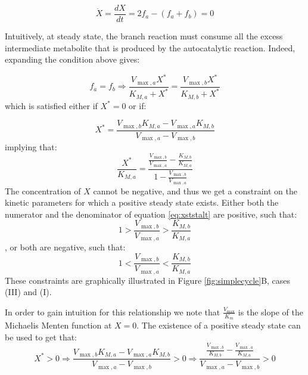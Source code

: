     \begin{equation}
      \label{eq:xdyna}
      \dot X = \frac{dX}{dt} = 2f_a - (f_a + f_b) = 0
    \end{equation}

    Intuitively, at steady state, the branch reaction must consume all the excess intermediate metabolite that is produced by the autocatalytic reaction.
    Indeed, expanding the condition above gives:

    \begin{equation*}
      f_a = f_b \Rightarrow \frac{V_{\max,a}X^*}{K_{M,a}+X^*}=\frac{V_{\max,b}X^*}{K_{M,b}+X^*}
    \end{equation*}
    which is satisfied either if $X^*=0$ or if:

    \begin{equation}
      \label{eq:xstst}
      X^*=\frac{V_{\max,b}K_{M,a}-V_{\max,a}K_{M,b}}{V_{\max,a}-V_{\max,b}}
    \end{equation}
    implying that:
    \begin{equation}
      \label{eq:xststalt}
      \frac{X^*}{K_{M,a}}=\frac{\frac{V_{\max,b}}{V_{\max,a}}-\frac{K_{M,b}}{K_{M,a}}}{1-\frac{V_{\max,b}}{V_{\max,a}}}
    \end{equation}
    The concentration of $X$ cannot be negative, and thus we get a constraint on the kinetic parameters for which a positive steady state exists.
    Either both the numerator and the denominator of equation \ref{eq:xststalt} are positive, such that:
    \begin{equation*}
    1>\frac{V_{\max,b}}{V_{\max,a}}>\frac{K_{M,b}}{K_{M,a}}
    \end{equation*}
    , or both are negative, such that:
    \begin{equation*}
    1<\frac{V_{\max,b}}{V_{\max,a}}<\frac{K_{M,b}}{K_{M,a}}
    \end{equation*}
    These constraints are graphically illustrated in Figure \ref{fig:simplecycle}B, cases (III) and (I).

    In order to gain intuition for this relationship we note that $\frac{V_{\max}}{K_m}$ is the slope of the Michaelis Menten function at $X=0$.
    The existence of a positive steady state can be used to get that:
    \begin{equation*}
      X^*>0 \Rightarrow \frac{V_{\max,b}K_{M,a}-V_{\max,a}K_{M,b}}{V_{\max,a}-V_{\max,b}}>0 \Rightarrow \frac{\frac{V_{\max,b}}{K_{M,b}}-\frac{V_{\max,a}}{K_{M,a}}}{V_{\max,a}-V_{\max,b}}>0
    \end{equation*}

